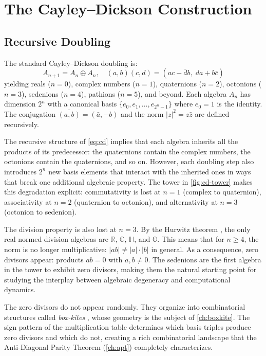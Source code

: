\documentclass[12pt,openany]{report}
\theoremstyle{definition}
\theoremstyle{plain}
\theoremstyle{remark}
\begin{document}
\chapter{The Cayley--Dickson Construction}
\label{ch:cayley-dickson}

\section{Recursive Doubling}

The standard Cayley--Dickson doubling is:
\begin{equation}
  A_{n+1} = A_n \oplus A_n, \quad
  (a,b)(c,d) = (ac - \bar{d}b,\; da + b\bar{c})
  \label{eq:cd}
\end{equation}
yielding reals ($n=0$), complex numbers ($n=1$), quaternions ($n=2$),
octonions ($n=3$), sedenions ($n=4$), pathions ($n=5$), and beyond.
Each algebra $A_n$ has dimension $2^n$ with a canonical basis
$\{e_0, e_1, \ldots, e_{2^n - 1}\}$ where $e_0 = 1$ is the identity.
The conjugation $\overline{(a,b)} = (\bar{a}, -b)$ and the norm
$|z|^2 = z\bar{z}$ are defined recursively.

The recursive structure of \cref{eq:cd} implies that each algebra
inherits all the products of its predecessor: the quaternions contain
the complex numbers, the octonions contain the quaternions, and so on.
However, each doubling step also introduces $2^n$ new basis elements
that interact with the inherited ones in ways that break one additional
algebraic property.  The tower in \cref{fig:cd-tower} makes this
degradation explicit: commutativity is lost at $n = 1$ (complex to
quaternion), associativity at $n = 2$ (quaternion to octonion), and
alternativity at $n = 3$ (octonion to sedenion).

The division property is also lost at $n = 3$.  By the Hurwitz theorem
\cite{Baez2002Octonions}, the only real normed division algebras are
$\mathbb{R}$, $\mathbb{C}$, $\mathbb{H}$, and $\mathbb{O}$.  This
means that for $n \geq 4$, the norm is no longer multiplicative:
$|ab| \neq |a| \cdot |b|$ in general.  As a consequence, zero divisors
appear: products $ab = 0$ with $a, b \neq 0$.  The sedenions are the
first algebra in the tower to exhibit zero divisors, making them the
natural starting point for studying the interplay between algebraic
degeneracy and computational dynamics.

The zero divisors do not appear randomly.  They organize into
combinatorial structures called \emph{box-kites}
\cite{deMarrais2000BoxKites}, whose geometry is the subject of
\cref{ch:boxkite}.  The sign pattern of the multiplication table
determines which basis triples produce zero divisors and which do not,
creating a rich combinatorial landscape that the Anti-Diagonal Parity
Theorem (\cref{ch:apt}) completely characterizes.
\end{document}

